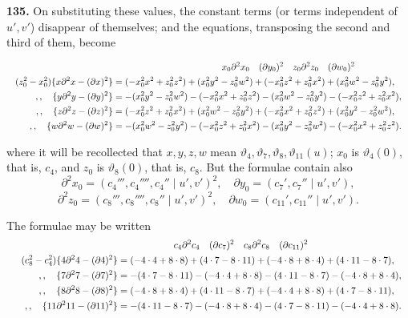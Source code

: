 \documentclass[11pt]{article}
\begin{document}
\medskip
\textbf{135.} On substituting these values, the constant terms (or terms independent of $u', v'$) disappear of themselves; and the equations, transposing the second and third of them, become

{\footnotesize
\[
\resizebox{\textwidth}{!}{$\displaystyle
\begin{aligned}
& \qquad\qquad\qquad\qquad\qquad\qquad x_0\partial^2 x_0\quad (\partial y_0)^2\quad z_0\partial^2 z_0\quad (\partial w_0)^2\\
(z_0^2 - x_0^2)\{x\partial^2 x - (\partial x)^2\} &= (-x_0^2 x^2 + z_0^2 z^2) + (x_0^2 y^2 - z_0^2 w^2) + (-x_0^2 z^2 + z_0^2 x^2) + (x_0^2 w^2 - z_0^2 y^2),\\
\quad,, \quad \{y\partial^2 y - (\partial y)^2\} &= -(x_0^2 y^2 - z_0^2 w^2) - (-x_0^2 x^2 + z_0^2 z^2) - (x_0^2 w^2 - z_0^2 y^2) - (-x_0^2 z^2 + z_0^2 x^2),\\
\quad,, \quad \{z\partial^2 z - (\partial z)^2\} &= (-x_0^2 z^2 + z_0^2 x^2) + (x_0^2 w^2 - z_0^2 y^2) + (-x_0^2 x^2 + z_0^2 z^2) + (x_0^2 y^2 - z_0^2 w^2),\\
\quad,, \quad \{w\partial^2 w - (\partial w)^2\} &= -(x_0^2 w^2 - z_0^2 y^2) - (-x_0^2 z^2 + z_0^2 x^2) - (x_0^2 y^2 - z_0^2 w^2) - (-x_0^2 x^2 + z_0^2 z^2).\\
\end{aligned}
$}
\]
}

where it will be recollected that $x, y, z, w$ mean $\vartheta_4, \vartheta_7, \vartheta_8, \vartheta_{11}(u)$; $x_0$ is $\vartheta_4(0)$, that is, $c_4$, and $z_0$ is $\vartheta_8(0)$, that is, $c_8$. But the formulae contain also
\[
\partial^2 x_0 = (c_4''', c_4'''', c_4''\mid u', v')^2,\quad \partial y_0 = (c_7', c_7'' \mid u', v'),
\]
\[
\partial^2 z_0 = (c_8''', c_8'''', c_8'' \mid u', v')^2,\quad \partial w_0 = (c_{11}', c_{11}'' \mid u', v').
\]

The formulae may be written
{\footnotesize
\[
\resizebox{\textwidth}{!}{$\displaystyle
\begin{aligned}
& \qquad\qquad\qquad c_4\partial^2 c_4\quad (\partial c_7)^2\quad c_8\partial^2 c_8\quad (\partial c_{11})^2\\
(c_8^2 - c_4^2)\{4\partial^2 4 - (\partial 4)^2\} &= (-4\cdot 4 + 8\cdot 8) + (4\cdot 7 - 8\cdot 11) + (-4\cdot 8 + 8\cdot 4) + (4\cdot 11 - 8\cdot 7),\\
\quad,, \quad \{7\partial^2 7 - (\partial 7)^2\} &= -(4\cdot 7 - 8\cdot 11) - (-4\cdot 4 + 8\cdot 8) - (4\cdot 11 - 8\cdot 7) - (-4\cdot 8 + 8\cdot 4),\\
\quad,, \quad \{8\partial^2 8 - (\partial 8)^2\} &= (-4\cdot 8 + 8\cdot 4) + (4\cdot 11 - 8\cdot 7) + (-4\cdot 4 + 8\cdot 8) + (4\cdot 7 - 8\cdot 11),\\
\quad,, \quad \{11\partial^2 11 - (\partial 11)^2\} &= -(4\cdot 11 - 8\cdot 7) - (-4\cdot 8 + 8\cdot 4) - (4\cdot 7 - 8\cdot 11) - (-4\cdot 4 + 8\cdot 8).\\
\end{aligned}
$}
\]
}
\end{document}
